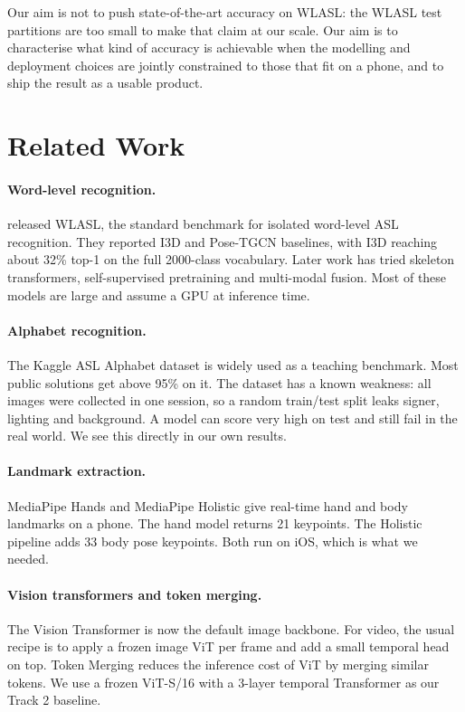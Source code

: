 \documentclass[11pt]{article}
\begin{document}
Our aim is not to push state-of-the-art accuracy on WLASL: the WLASL test partitions are too small to make that claim at our scale. Our aim is to characterise what kind of accuracy is achievable when the modelling and deployment choices are jointly constrained to those that fit on a phone, and to ship the result as a usable product.

\section{Related Work}

\paragraph{Word-level recognition.} \citet{li2020wlasl} released WLASL, the standard benchmark for isolated word-level ASL recognition. They reported I3D \citep{carreira2017quo} and Pose-TGCN baselines, with I3D reaching about 32\% top-1 on the full 2000-class vocabulary. Later work has tried skeleton transformers, self-supervised pretraining and multi-modal fusion. Most of these models are large and assume a GPU at inference time.

\paragraph{Alphabet recognition.} The Kaggle ASL Alphabet dataset \citep{aslalphabet2018} is widely used as a teaching benchmark. Most public solutions get above 95\% on it. The dataset has a known weakness: all images were collected in one session, so a random train/test split leaks signer, lighting and background. A model can score very high on test and still fail in the real world. We see this directly in our own results.

\paragraph{Landmark extraction.} MediaPipe Hands and MediaPipe Holistic \citep{lugaresi2019mediapipe, zhang2020mediapipe} give real-time hand and body landmarks on a phone. The hand model returns 21 keypoints. The Holistic pipeline adds 33 body pose keypoints. Both run on iOS, which is what we needed.

\paragraph{Vision transformers and token merging.} The Vision Transformer \citep{dosovitskiy2021an} is now the default image backbone. For video, the usual recipe is to apply a frozen image ViT per frame and add a small temporal head on top. Token Merging \citep{bolya2023token} reduces the inference cost of ViT by merging similar tokens. We use a frozen ViT-S/16 with a 3-layer temporal Transformer as our Track 2 baseline.
\end{document}
